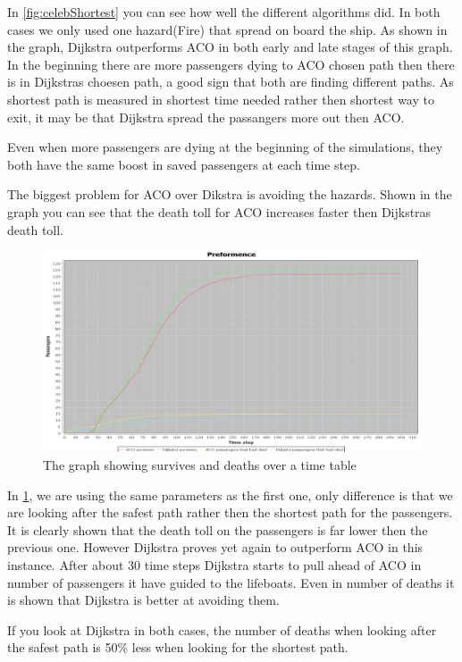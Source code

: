 In \ref{fig:celebShortest} you can see how well the different algorithms did. In both cases we only used one hazard(Fire) that spread on board the ship. As shown in the graph, Dijkstra outperforms ACO in both early and late stages of this graph. In the beginning there are more passengers dying to ACO chosen path then there is in Dijkstras choesen path, a good sign that both are finding different paths. As shortest path is measured in shortest time needed rather then shortest way to exit, it may be that Dijkstra spread the passangers more out then ACO.

Even when more passengers are dying at the beginning of the simulations, they both have the same boost in saved passengers at each time step.

The biggest problem for ACO over Dikstra is avoiding the hazards. Shown in the graph you can see that the death toll for ACO increases faster then Dijkstras death toll.

\begin{figure} [h]
\centering
\hspace*{-5.5in}
\includegraphics[scale=0.35]{images/Graph using 200 rounds 140 passangers and safest first one hazzard.png}
\caption{The graph showing survives and deaths over a time table}
\label{fig:celebSafty}
\end{figure}

In \ref{fig:celebSafty}, we are using the same parameters as the first one, only difference is that we are looking after the safest path rather then the shortest path for the passengers. It is clearly shown that the death toll on the passengers is far lower then the previous one.
However Dijkstra proves yet again to outperform ACO in this instance. After about 30 time steps Dijkstra starts to pull ahead of ACO in number of passengers it have guided to the lifeboats. Even in number of deaths it is shown that Dijkstra is better at avoiding them.

If you look at Dijkstra in both cases, the number of deaths when looking after the safest path is 50\% less when looking for the shortest path.